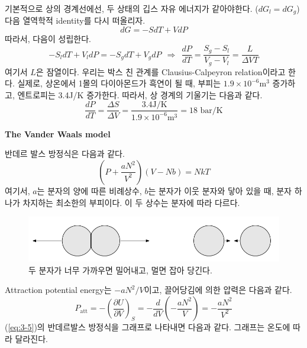 \documentclass{article}
\begin{document}
기본적으로 상의 경계선에선, 두 상태의 깁스 자유 에너지가 같아야한다. ($dG_l = dG_g$) 다음 열역학적 identity를 다시 떠올리자.
\begin{equation}
    dG = -SdT + VdP
\end{equation} 
따라서, 다음이 성립한다.
\begin{equation}
    -S_{l} dT + V_l dP = -S_g dT  + V_g dP \ \ \Rightarrow \ \ \boxed{\frac{dP}{dT} = \frac{S_g - S_l}{V_g - V_l} = \frac{L}{\Delta V T}}
\end{equation}
여기서 $L$은 잠열이다. 우리는 박스 친 관계를 Clausius-Calpeyron relation이라고 한다. 실제로, 상온에서 1몰의 다이아몬드가 흑연이 될 때, 부피는 $1.9 \times 10^{-6}$m$^{3}$ 증가하고, 엔트로피는 3.4J/K 증가한다. 따라서,  상 경계의 기울기는 다음과 같다.
\begin{equation}
    \frac{dP}{dT} = \frac{\Delta S}{\Delta V} = \frac{3.4 \text{J/K}}{1.9 \times 10^{-6}\text{m}^3} = 18 \text{ bar/K}
\end{equation}

\noindent
\textbf{The Vander Waals model}

반데르 발스 방정식은 다음과 같다.
\begin{equation}\label{eq:3-5}
   \boxed{\left( P + \frac{aN^2}{V^2} \right)(V-Nb) = NkT}
\end{equation}
여기서, $a$는 분자의 양에 따른 비례상수, $b$는 분자가 이웃 분자와 닿아 있을 때, 분자 하나가 차지하는 최소한의 부피이다. 이 두 상수는 분자에 따라 다르다.

\begin{figure}[h]
    \centering
    \includegraphics[width=0.7\linewidth]{images/fig3_6.png}
    \caption{두 분자가 너무 가까우면 밀어내고, 멀면 잡아 당긴다.}
\end{figure}

\newpage

Attraction potential energy는 $-aN^2/V$이고, 끌어당김에 의한 압력은 다음과 같다.
\begin{equation}
    P_{\text{att}} = - \left( \frac{\partial U}{\partial V} \right)_S = -\frac{d}{dV} \left(- \frac{aN^2}{V} \right) = - \frac{aN^2}{V^2}
\end{equation}
(\ref{eq:3-5})의 반데르발스 방정식을 그래프로 나타내면 다음과 같다. 그래프는 온도에 따라 달라진다.
\end{document}
